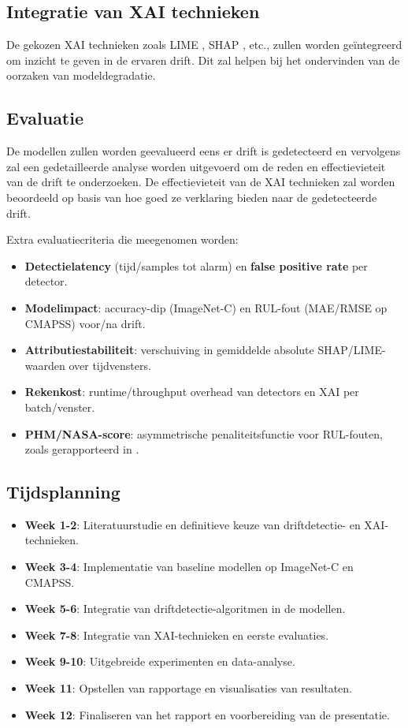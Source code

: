 \subsection{Integratie van XAI technieken}
De gekozen XAI technieken zoals LIME \autocite{garreau2020explaining}, SHAP \autocite{VandenBroeck2022}, etc., zullen worden geïntegreerd om inzicht te geven in de ervaren drift. Dit zal helpen bij het ondervinden van de oorzaken van modeldegradatie.

\subsection{Evaluatie}
De modellen zullen worden geevalueerd eens er drift is gedetecteerd en vervolgens zal een gedetailleerde analyse worden uitgevoerd om de reden en effectievieteit van de drift te onderzoeken. De effectievieteit van de XAI technieken zal worden beoordeeld op basis van hoe goed ze verklaring bieden naar de gedetecteerde drift.

Extra evaluatiecriteria die meegenomen worden:

\begin{itemize}
	\item \textbf{Detectielatency} (tijd/samples tot alarm) en \textbf{false positive rate} per detector.
	\item \textbf{Modelimpact}: accuracy-dip (ImageNet-C) en RUL-fout (MAE/RMSE op CMAPSS) voor/na drift.
	\item \textbf{Attributiestabiliteit}: verschuiving in gemiddelde absolute SHAP/LIME-waarden over tijdvensters.
	\item \textbf{Rekenkost}: runtime/throughput overhead van detectors en XAI per batch/venster.
	\item \textbf{PHM/NASA-score}: asymmetrische penaliteitsfunctie voor RUL-fouten, zoals gerapporteerd in \autocite{Saxena2008}.
\end{itemize}

\subsection{Tijdsplanning}

\begin{itemize}
	\item \textbf{Week 1-2}: Literatuurstudie en definitieve keuze van driftdetectie- en XAI-technieken.
	\item \textbf{Week 3-4}: Implementatie van baseline modellen op ImageNet-C en CMAPSS.
	\item \textbf{Week 5-6}: Integratie van driftdetectie-algoritmen in de modellen.
	\item \textbf{Week 7-8}: Integratie van XAI-technieken en eerste evaluaties.
	\item \textbf{Week 9-10}: Uitgebreide experimenten en data-analyse.
	\item \textbf{Week 11}: Opstellen van rapportage en visualisaties van resultaten.
	\item \textbf{Week 12}: Finaliseren van het rapport en voorbereiding van de presentatie.
\end{itemize}

